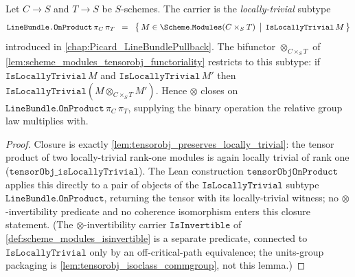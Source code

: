 \begin{lemma}




  \label{lem:tensorobj_lift_onproduct}
  Let \(C \to S\) and \(T \to S\) be \(S\)-schemes. The carrier is the
  \emph{locally-trivial} subtype
  \[
    \texttt{LineBundle.OnProduct}\,\pi_C\,\pi_T
    \;\;=\;\;
    \bigl\{\,M \in \Scheme.\mathtt{Modules}(C \times_S T)
            \,\bigm|\, \mathtt{IsLocallyTrivial}\,M \,\bigr\}
  \]
  introduced in \cref{chap:Picard_LineBundlePullback}. The bifunctor
  \(\otimes_{C \times_S T}\) of
  \cref{lem:scheme_modules_tensorobj_functoriality} restricts to this subtype:
  if \(\mathtt{IsLocallyTrivial}\,M\) and \(\mathtt{IsLocallyTrivial}\,M'\) then
  \(\mathtt{IsLocallyTrivial}(M \otimes_{C \times_S T} M')\). Hence \(\otimes\)
  closes on \(\texttt{LineBundle.OnProduct}\,\pi_C\,\pi_T\), supplying the binary
  operation the relative group law multiplies with.
\end{lemma}

\begin{proof}
  \leanok
  Closure is exactly
  \cref{lem:tensorobj_preserves_locally_trivial}: the tensor product of two
  locally-trivial rank-one modules is again locally trivial of rank one
  (\(\mathtt{tensorObj\_isLocallyTrivial}\)). The Lean construction
  \(\mathtt{tensorObjOnProduct}\) applies this directly to a pair of objects of
  the \(\mathtt{IsLocallyTrivial}\) subtype \(\texttt{LineBundle.OnProduct}\),
  returning the tensor with its locally-trivial witness; no
  \(\otimes\)-invertibility predicate and no coherence isomorphism enters this
  closure statement. (The \(\otimes\)-invertibility carrier
  \(\mathtt{IsInvertible}\) of \cref{def:scheme_modules_isinvertible} is a
  separate predicate, connected to \(\mathtt{IsLocallyTrivial}\) only by an
  off-critical-path equivalence; the units-group packaging is
  \cref{lem:tensorobj_isoclass_commgroup}, not this lemma.)
\end{proof}

